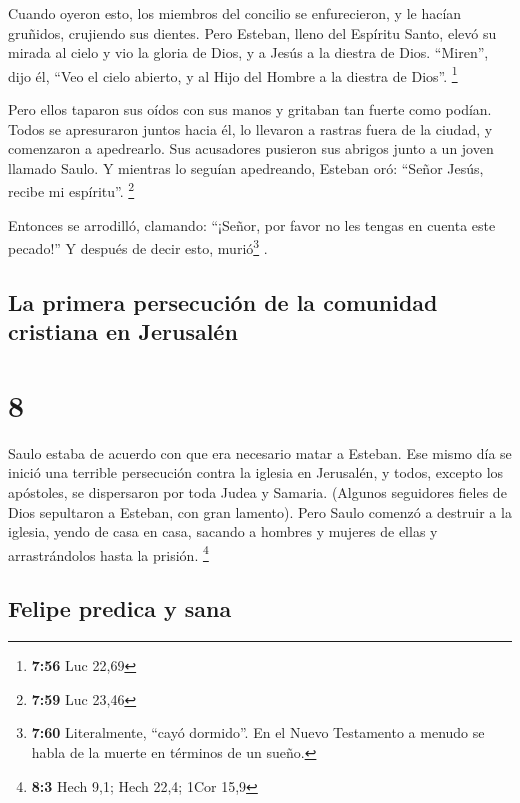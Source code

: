  Cuando oyeron esto, los miembros del concilio se
enfurecieron, y le hacían gruñidos, crujiendo sus dientes.
 Pero Esteban, lleno del Espíritu Santo, elevó su mirada
al cielo y vio la gloria de Dios, y a Jesús a la diestra de Dios.
 ``Miren'', dijo él, ``Veo el cielo abierto, y al Hijo
del Hombre a la diestra de Dios''. \footnote{\textbf{7:56} Luc 22,69}

 Pero ellos taparon sus oídos con sus manos y gritaban
tan fuerte como podían. Todos se apresuraron juntos hacia él,
 lo llevaron a rastras fuera de la ciudad, y comenzaron a
apedrearlo. Sus acusadores pusieron sus abrigos junto a un joven llamado
Saulo.  Y mientras lo seguían apedreando, Esteban oró:
``Señor Jesús, recibe mi espíritu''. \footnote{\textbf{7:59} Luc 23,46}

 Entonces se arrodilló, clamando: ``¡Señor, por favor no
les tengas en cuenta este pecado!'' Y después de decir esto,
murió\footnote{\textbf{7:60} Literalmente, ``cayó dormido''. En el Nuevo
  Testamento a menudo se habla de la muerte en términos de un sueño.} .

\hypertarget{la-primera-persecuciuxf3n-de-la-comunidad-cristiana-en-jerusaluxe9n}{%
\subsection{La primera persecución de la comunidad cristiana en
Jerusalén}\label{la-primera-persecuciuxf3n-de-la-comunidad-cristiana-en-jerusaluxe9n}}

\hypertarget{section-7}{%
\section{8}\label{section-7}}

 Saulo estaba de acuerdo con que era necesario matar a
Esteban. Ese mismo día se inició una terrible persecución contra la
iglesia en Jerusalén, y todos, excepto los apóstoles, se dispersaron por
toda Judea y Samaria.  (Algunos seguidores fieles de Dios
sepultaron a Esteban, con gran lamento).  Pero Saulo
comenzó a destruir a la iglesia, yendo de casa en casa, sacando a
hombres y mujeres de ellas y arrastrándolos hasta la prisión.
\footnote{\textbf{8:3} Hech 9,1; Hech 22,4; 1Cor 15,9}

\hypertarget{felipe-predica-y-sana}{%
\subsection{Felipe predica y sana}\label{felipe-predica-y-sana}}

